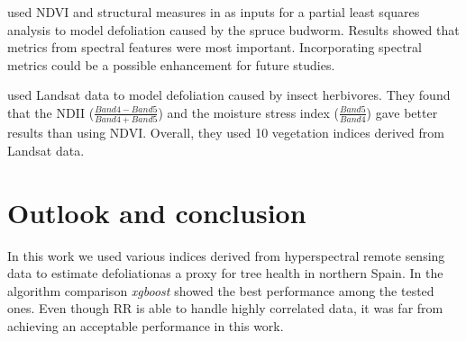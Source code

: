 \documentclass[review]{elsarticle}
\begin{document}
\cite{goodbody2018} used NDVI and structural measures in as inputs for a partial least squares analysis to model defoliation caused by the spruce budworm.
Results showed that metrics from spectral features were most important.
Incorporating spectral metrics could be a possible enhancement for future studies.

\cite{townsend2012} used Landsat data to model defoliation caused by insect herbivores.
They found that the \ac{NDII} ($\frac{Band 4 - Band 5}{Band 4 + Band 5}$) and the moisture stress index ($\frac{Band 5}{Band 4}$) gave better results than using NDVI.
Overall, they used 10 vegetation indices derived from Landsat data.





\section{Outlook and conclusion}

\noindent In this work we used various indices derived from hyperspectral remote sensing data to estimate defoliationas a proxy for tree health in northern Spain.
In the algorithm comparison \textit{xgboost} showed the best performance among the tested ones.
Even though \ac{RR} is able to handle highly correlated data, it was far from achieving an acceptable performance in this work.
\end{document}

